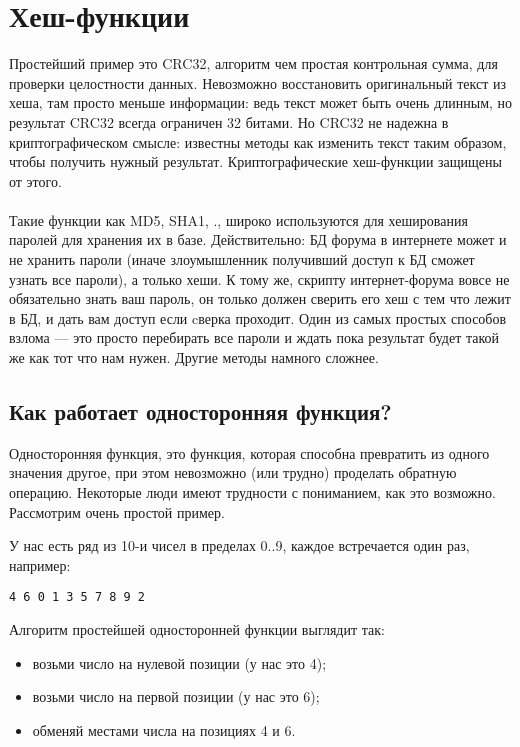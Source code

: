 ﻿\ifdefined\RUSSIAN
\newcommand{\HashFuncChapterName}{Хеш-функции}
\chapter{\HashFuncChapterName}
\label{hash_func}

\index{\HashFuncChapterName}
Простейший пример это CRC32, алгоритм  чем простая контрольная сумма,
для проверки целостности данных.
Невозможно восстановить оригинальный текст из хеша, там просто меньше информации: ведь текст
может быть очень длинным, но результат CRC32 всегда ограничен 32 битами.
Но CRC32 не надежна в криптографическом смысле: известны методы как изменить текст таким образом,
чтобы получить нужный результат.
Криптографические хеш-функции защищены от этого. \\
\\
Такие функции как MD5, SHA1, \etc{}., широко используются для хеширования паролей
для хранения их в базе.
Действительно: БД форума в интернете может и не хранить пароли 
(иначе злоумышленник получивший доступ к БД сможет узнать все пароли), а только хеши.
К тому же, скрипту интернет-форума вовсе не обязательно знать ваш пароль, он только должен
сверить его хеш с тем что лежит в БД, и дать вам доступ если cверка проходит.
Один из самых простых способов взлома --- это просто перебирать все пароли и ждать пока
результат будет такой же как тот что нам нужен.
Другие методы намного сложнее.

\section{Как работает односторонняя функция?}

Односторонняя функция, это функция, которая способна превратить из одного значения другое,
при этом невозможно (или трудно) проделать обратную операцию.
Некоторые люди имеют трудности с пониманием, как это возможно.
Рассмотрим очень простой пример.

У нас есть ряд из 10-и чисел в пределах 0..9, каждое встречается один раз, например:

\begin{lstlisting}
4 6 0 1 3 5 7 8 9 2
\end{lstlisting}

Алгоритм простейшей односторонней функции выглядит так:

\begin{itemize}
\item возьми число на нулевой позиции (у нас это 4);
\item возьми число на первой позиции (у нас это 6);
\item обменяй местами числа на позициях 4 и 6.
\end{itemize}

